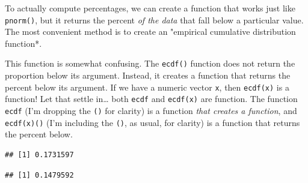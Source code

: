 \documentclass[]{book}
\newenvironment{Shaded}{\begin{snugshade}}{\end{snugshade}}
\newcommand{\CommentTok}[1]{\textcolor[rgb]{0.56,0.35,0.01}{\textit{#1}}}
\newcommand{\DataTypeTok}[1]{\textcolor[rgb]{0.13,0.29,0.53}{#1}}
\newcommand{\DecValTok}[1]{\textcolor[rgb]{0.00,0.00,0.81}{#1}}
\newcommand{\FloatTok}[1]{\textcolor[rgb]{0.00,0.00,0.81}{#1}}
\newcommand{\KeywordTok}[1]{\textcolor[rgb]{0.13,0.29,0.53}{\textbf{#1}}}
\newcommand{\NormalTok}[1]{#1}
\newcommand{\OperatorTok}[1]{\textcolor[rgb]{0.81,0.36,0.00}{\textbf{#1}}}
\newcommand{\StringTok}[1]{\textcolor[rgb]{0.31,0.60,0.02}{#1}}
\begin{document}
To actually compute percentages, we can create a function that works just like \texttt{pnorm()}, but it returns the percent \emph{of the data} that fall below a particular value. The most convenient method is to create an "empirical cumulative distribution function*.

This function is somewhat confusing. The \texttt{ecdf()} function does not return the proportion below its argument. Instead, it creates a function that returns the percent below its argument. If we have a numeric vector \texttt{x}, then \texttt{ecdf(x)} is a function! Let that settle in\ldots{} both \texttt{ecdf} and \texttt{ecdf(x)} are function. The function \texttt{ecdf} (I'm dropping the \texttt{()} for clarity) is a function \emph{that creates a function}, and \texttt{ecdf(x)()} (I'm including the \texttt{()}, as usual, for clarity) is a function that returns the percent below.

\begin{Shaded}
\end{Shaded}

\begin{verbatim}
## [1] 0.1731597
\end{verbatim}

\begin{Shaded}
\end{Shaded}

\begin{verbatim}
## [1] 0.1479592
\end{verbatim}
\end{document}
